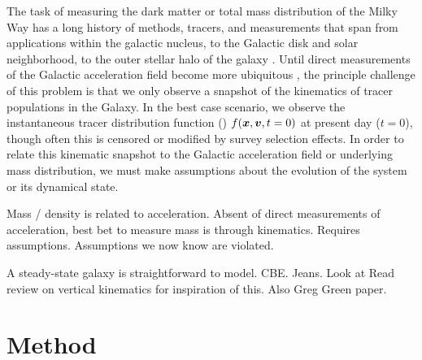 The task of measuring the dark matter or total mass distribution of the Milky Way has a
long history of methods, tracers, and measurements that span from applications within
the galactic nucleus, to the Galactic disk and solar neighborhood, to the outer stellar
halo of the galaxy \citep[e.g.,][]{todo}.
Until direct measurements of the Galactic acceleration field become more ubiquitous
\citep{todo}, the principle challenge of this problem is that we only observe a snapshot
of the kinematics of tracer populations in the Galaxy.
In the best case scenario, we observe the instantaneous tracer distribution function
(\df) $f(\boldsymbol{x}, \boldsymbol{v}, t=0)$ at present day ($t=0$), though often this is censored or
modified by survey selection effects.
In order to relate this kinematic snapshot to the Galactic acceleration field or
underlying mass distribution, we must make assumptions about the evolution of the system
or its dynamical state.


Mass / density is related to acceleration.
Absent of direct measurements of acceleration, best bet to measure mass is through kinematics. Requires assumptions. Assumptions we now know are violated.

A steady-state galaxy is straightforward to model. CBE. Jeans. Look at Read review on vertical kinematics for inspiration of this. Also Greg Green paper.






\section{Method} \label{sec:method}

